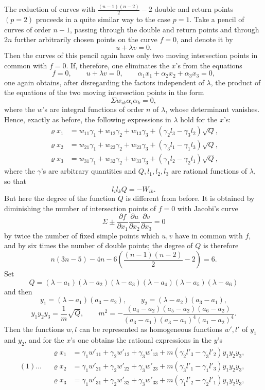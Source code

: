\documentclass[10pt]{article}
\begin{document}
The reduction of curves with \(\frac{(n-1)(n-2)}{2}-2\) double and return points \((p=2)\) proceeds in a quite similar way to the case \(p=1\). Take a pencil of curves of order \(n-1\), passing through the double and return points and through \(2n\) further arbitrarily chosen points on the curve \(f=0\), and denote it by
\[
u+\lambda v=0.
\]
Then the curves of this pencil again have only two moving intersection points in common with \(f=0\). If, therefore, one eliminates the \(x\)'s from the equations
\[
f=0,\qquad u+\lambda v=0,\qquad \alpha_1x_1+\alpha_2x_2+\alpha_3x_3=0,
\]
one again obtains, after disregarding the factors independent of \(\lambda\), the product of the equations of the two moving intersection points in the form
\[
\Sigma w_{ik}\alpha_i\alpha_k=0,
\]
where the \(w\)'s are integral functions of order \(n\) of \(\lambda\), whose determinant vanishes. Hence, exactly as before, the following expressions in \(\lambda\) hold for the \(x\)'s:
\[
\begin{aligned}
\varrho x_1&=w_{11}\gamma_1+w_{12}\gamma_2+w_{13}\gamma_3+(\gamma_2l_3-\gamma_3l_2)\sqrt Q,\\
\varrho x_2&=w_{21}\gamma_1+w_{22}\gamma_2+w_{23}\gamma_3+(\gamma_3l_1-\gamma_1l_3)\sqrt Q,\\
\varrho x_3&=w_{31}\gamma_1+w_{32}\gamma_2+w_{33}\gamma_3+(\gamma_1l_2-\gamma_2l_1)\sqrt Q,
\end{aligned}
\]
where the \(\gamma\)'s are arbitrary quantities and \(Q,l_1,l_2,l_3\) are rational functions of \(\lambda\), so that
\[
l_il_kQ=-W_{ik}.
\]
But here the degree of the function \(Q\) is different from before. It is obtained by diminishing the number of intersection points of \(f=0\) with Jacobi's curve
\[
\Sigma\pm\frac{\partial f}{\partial x_1}\frac{\partial u}{\partial x_2}\frac{\partial v}{\partial x_3}=0
\]
by twice the number of fixed simple points which \(u,v\) have in common with \(f\), and by six times the number of double points; the degree of \(Q\) is therefore
\[
n(3n-5)-4n-6\left(\frac{(n-1)(n-2)}{2}-2\right)=6.
\]
Set
\[
Q=(\lambda-a_1)(\lambda-a_2)(\lambda-a_3)(\lambda-a_4)(\lambda-a_5)(\lambda-a_6)
\]
and then
\[
y_1=(\lambda-a_1)(a_3-a_2),\qquad y_2=(\lambda-a_2)(a_3-a_1),
\]
\[
y_1y_2y_3=\frac{1}{m}\sqrt Q,\qquad
m^2=-\frac{(a_4-a_2)(a_5-a_2)(a_6-a_2)}
{(a_3-a_1)(a_3-a_1)^4(a_1-a_2)^4}.
\]
Then the functions \(w,l\) can be represented as homogeneous functions \(w',l'\) of \(y_1\) and \(y_2\), and for the \(x\)'s one obtains the rational expressions in the \(y\)'s
\[
(1)\ldots\quad
\begin{aligned}
\varrho x_1&=\gamma_1w'_{11}+\gamma_2w'_{12}+\gamma_3w'_{13}
+m(\gamma_2l'_3-\gamma_3l'_2)y_1y_2y_3,\\
\varrho x_2&=\gamma_1w'_{21}+\gamma_2w'_{22}+\gamma_3w'_{23}
+m(\gamma_3l'_1-\gamma_1l'_3)y_1y_2y_3,\\
\varrho x_3&=\gamma_1w'_{31}+\gamma_2w'_{32}+\gamma_3w'_{33}
+m(\gamma_1l'_2-\gamma_2l'_1)y_1y_2y_3,
\end{aligned}
\]
\end{document}

